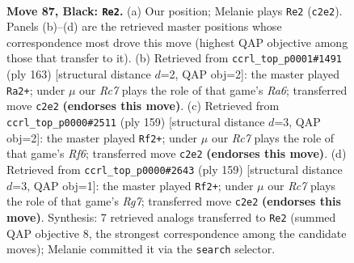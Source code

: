 \documentclass[11pt]{article}
\begin{document}
\clearpage

\begin{figure}[p]\centering
\begin{subfigure}{0.46\textwidth}\centering
\resizebox{\linewidth}{!}{%
\newchessgame
\chessboard[
  setfen={3R4/5k2/8/5p2/8/7K/2r5/8 b - - 3 87},
  showmover=false,
  pgfstyle=straightmove, color=movearrow, markmove={c2-e2}
]}
\caption{}
\end{subfigure}\hfill
\begin{subfigure}{0.46\textwidth}\centering
\resizebox{\linewidth}{!}{%
\newchessgame
\chessboard[
  setfen={8/6k1/1R6/8/6P1/r7/6K1/8 b - - 4 82},
  showmover=false,
  pgfstyle=straightmove, color=movearrow, markmove={a3-a2}
]}
\caption{}
\end{subfigure}
\\[4pt]
\begin{subfigure}{0.46\textwidth}\centering
\resizebox{\linewidth}{!}{%
\newchessgame
\chessboard[
  setfen={8/k1P5/6R1/p7/8/5r2/1K6/8 b - - 0 80},
  showmover=false,
  pgfstyle=straightmove, color=movearrow, markmove={f3-f2}
]}
\caption{}
\end{subfigure}\hfill
\begin{subfigure}{0.46\textwidth}\centering
\resizebox{\linewidth}{!}{%
\newchessgame
\chessboard[
  setfen={8/4k3/8/p4K2/7P/3R4/6r1/8 b - - 9 80},
  showmover=false,
  pgfstyle=straightmove, color=movearrow, markmove={g2-f2}
]}
\caption{}
\end{subfigure}
\caption{\textbf{Move 87, Black: \texttt{Re2}.} (a) Our position; Melanie plays \texttt{Re2} (\texttt{c2e2}). Panels (b)--(d) are the retrieved master positions whose correspondence most drove this move (highest QAP objective among those that transfer to it). (b) Retrieved from \texttt{ccrl\_top\_p0001\#1491} (ply 163) [structural distance $d$=2, QAP obj=2]: the master played \texttt{Ra2+}; under $\mu$ our \emph{Rc7} plays the role of that game's \emph{Ra6}; transferred move \texttt{c2e2} \textbf{(endorses this move)}. (c) Retrieved from \texttt{ccrl\_top\_p0000\#2511} (ply 159) [structural distance $d$=3, QAP obj=2]: the master played \texttt{Rf2+}; under $\mu$ our \emph{Rc7} plays the role of that game's \emph{Rf6}; transferred move \texttt{c2e2} \textbf{(endorses this move)}. (d) Retrieved from \texttt{ccrl\_top\_p0000\#2643} (ply 159) [structural distance $d$=3, QAP obj=1]: the master played \texttt{Rf2+}; under $\mu$ our \emph{Rc7} plays the role of that game's \emph{Rg7}; transferred move \texttt{c2e2} \textbf{(endorses this move)}. Synthesis: 7 retrieved analogs transferred to \texttt{Re2} (summed QAP objective 8, the strongest correspondence among the candidate moves); Melanie committed it via the \texttt{search} selector.}
\label{fig:thought-m173}
\end{figure}
\end{document}
